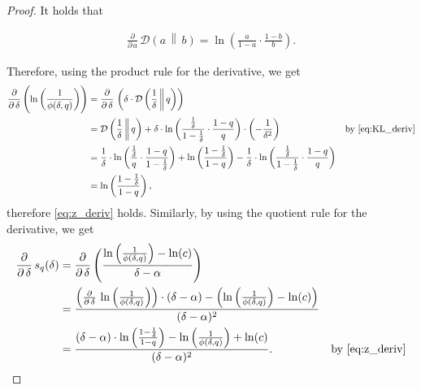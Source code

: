\documentclass[letterpaper,11pt]{article}
\newcommand{\1}[1]{\mathds{1}\left[#1\right]}
\newcommand{\D}[2]{\mathcal{D}\left(#1\, \middle\|\,#2 \right)}
\begin{document}
\begin{proof}
	It holds that

	\begin{align}\label{eq:KL_deriv}
		\frac{\partial}{\partial\,a} \,\D{a}{b}= \ln\! \left(\frac{a}{1 - a} \cdot \frac{1 - b}{b}\right).
	\end{align}

	Therefore, using the product rule for the derivative, we get
	\begin{align*}
		\frac{\partial}{\partial\,\delta}\, \Biggl(\ln\left( \frac{1}{\phi(\delta,q)} \right)\Biggr) &= \frac{\partial}{\partial\,\delta}\, \left( \delta \cdot \D{\frac{1}{\delta}}{q} \right) \\
						&= \D{\frac{1}{\delta}}{q} + \delta \cdot \ln\left( \frac{\frac{1}{\delta}}{1 - \frac{1}{\delta}} \cdot \frac{1-q}{q} \right) \cdot \left( -\frac{1}{\delta^{2}} \right) &\text{by } \eqref{eq:KL_deriv} \\
						&= \frac{1}{\delta} \cdot \ln\left( \frac{\frac{1}{\delta}}{q} \cdot \frac{1 - q}{1 - \frac{1}{\delta}}\right) + \ln\left( \frac{1 - \frac{1}{\delta}}{1 - q} \right) -\frac{1}{\delta}\cdot \ln\left( \frac{\frac{1}{\delta}}{1 - \frac{1}{\delta}} \cdot \frac{1 - q}{q} \right)\\
						&= \ln\left( \frac{1 - \frac{1}{\delta}}{1 - q} \right),
	\end{align*}
	therefore \eqref{eq:z_deriv} holds.
	Similarly, by using the quotient rule for the derivative, we get
	\begin{align*}
		\frac{\partial}{\partial\,\delta}\,s_{q}(\delta) &= \frac{\partial}{\partial\,\delta}\,\Biggl(\frac{\ln\left( \frac{1}{\phi(\delta,q)} \right) - \ln(c)}{\delta - \alpha}\Biggr)\\
		&= \frac{\Bigl( \frac{\partial}{\partial\,\delta} \,\ln\left( \frac{1}{\phi(\delta,q)} \right)\Bigr) \cdot (\delta - \alpha) - \Bigl( \ln\left( \frac{1}{\phi(\delta,q)} \right) - \ln(c) \Bigr)}{(\delta - \alpha)^{2}}\\
					       &= \frac{(\delta - \alpha) \cdot \ln\left( \frac{1 - \frac{1}{\delta}}{1 - q} \right) - \ln\left( \frac{1}{\phi(\delta,q)} \right) + \ln(c)}{(\delta-  \alpha)^{2}}. &\text{by } \eqref{eq:z_deriv}
	\end{align*}


\end{proof}
\end{document}
